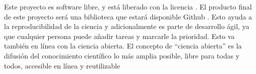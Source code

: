 Este proyecto es software libre, y está liberado con la licencia \cite{gplv3}. El producto final de este proyecto será una
biblioteca que estará disponible Github \cite{project_repository}. Esto ayuda a la reproducibilidad de la ciencia y 
adicionalmente es parte de desarrollo ágil, ya que cualquier persona puede añadir tareas y marcarle la prioridad. Esto va
también en línea con la ciencia abierta. El concepto de “ciencia abierta” es la difusión del conocimiento científico 
lo más amplia posible, libre para todas y todos, accesible en línea y reutilizable
